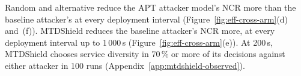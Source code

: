 \documentclass{cshonours}
\newcommand{\prelim}[1]{#1}
\begin{document}
Random and alternative reduce the APT attacker model's NCR more than the
baseline attacker's at every deployment interval
(Figure~\ref{fig:eff-cross-arm}(d) and~(f)). MTDShield reduces the baseline
attacker's NCR more, at every deployment interval up to \prelim{1\,000}\,s
(Figure~\ref{fig:eff-cross-arm}(e)). At 200\,s, MTDShield chooses service
diversity in \prelim{70}\,\% or more of its decisions against either attacker
in 100 runs (Appendix~\ref{app:mtdshield-observed}).
\end{document}
